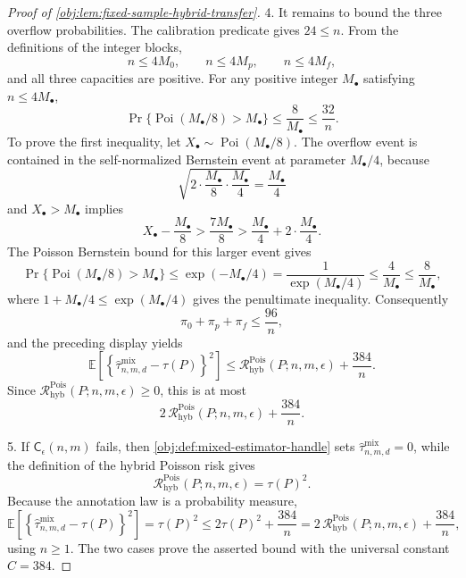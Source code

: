 \begin{proof}[Proof of \cref{obj:lem:fixed-sample-hybrid-transfer}]
4. It remains to bound the three overflow probabilities.  The calibration predicate gives \(24\le n\).  From the definitions of the integer blocks,
\[
n\le4M_0,\qquad n\le4M_p,\qquad n\le4M_f,
\]
and all three capacities are positive.  For any positive integer \(M_\bullet\) satisfying \(n\le4M_\bullet\),
\[
\Pr\{\operatorname{Poi}(M_\bullet/8)>M_\bullet\}
\le
\frac{8}{M_\bullet}
\le
\frac{32}{n}.
\]
To prove the first inequality, let \(X_\bullet\sim\operatorname{Poi}(M_\bullet/8)\).  The overflow event is contained in the self-normalized Bernstein event at parameter \(M_\bullet/4\), because
\[
\sqrt{2\cdot\frac{M_\bullet}{8}\cdot\frac{M_\bullet}{4}}
=\frac{M_\bullet}{4}
\]
and \(X_\bullet>M_\bullet\) implies
\[
X_\bullet-\frac{M_\bullet}{8}
>\frac{7M_\bullet}{8}
>\frac{M_\bullet}{4}+2\cdot\frac{M_\bullet}{4}.
\]
The Poisson Bernstein bound for this larger event gives
\[
\Pr\{\operatorname{Poi}(M_\bullet/8)>M_\bullet\}
\le
\exp(-M_\bullet/4)
=
\frac1{\exp(M_\bullet/4)}
\le
\frac{4}{M_\bullet}
\le
\frac{8}{M_\bullet},
\]
where \(1+M_\bullet/4\le \exp(M_\bullet/4)\) gives the penultimate inequality.
Consequently
\[
\pi_0+\pi_p+\pi_f\le \frac{96}{n},
\]
and the preceding display yields
\[
\mathbb E\!\left[
\left\{\widehat\tau^{\mathrm{mix}}_{n,m,d}-\tau(P)\right\}^2
\right]
\le
\mathcal R^{\mathrm{Pois}}_{\mathrm{hyb}}(P;n,m,\epsilon)
+\frac{384}{n}.
\]
Since \(\mathcal R^{\mathrm{Pois}}_{\mathrm{hyb}}(P;n,m,\epsilon)\ge0\), this is at most
\[
2\,\mathcal R^{\mathrm{Pois}}_{\mathrm{hyb}}(P;n,m,\epsilon)
+\frac{384}{n}.
\]

5. If \(\mathsf C_\epsilon(n,m)\) fails, then \cref{obj:def:mixed-estimator-handle} sets
\(\widehat\tau^{\mathrm{mix}}_{n,m,d}=0\), while the definition of the hybrid Poisson risk gives
\[
\mathcal R^{\mathrm{Pois}}_{\mathrm{hyb}}(P;n,m,\epsilon)=\tau(P)^2.
\]
Because the annotation law is a probability measure,
\[
\mathbb E\!\left[
\left\{\widehat\tau^{\mathrm{mix}}_{n,m,d}-\tau(P)\right\}^2
\right]
=
\tau(P)^2
\le
2\tau(P)^2+\frac{384}{n}
=
2\,\mathcal R^{\mathrm{Pois}}_{\mathrm{hyb}}(P;n,m,\epsilon)+\frac{384}{n},
\]
using \(n\ge1\).  The two cases prove the asserted bound with the universal constant \(C=384\). %
\end{proof}
